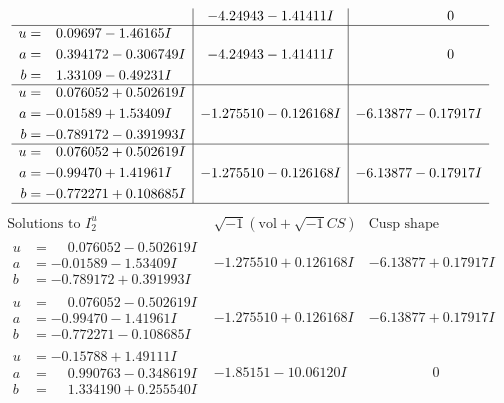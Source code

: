 \documentclass[1p]{elsarticle_modified}
\theoremstyle{definition}
\newcommand{\I}{\sqrt{-1}}
\begin{document}
$$\begin{array}{c|c|c}
 & -4.24943 - 1.41411 I & \phantom{-0.000000 } 0 \\ \hline\begin{aligned}
u &= \phantom{-}0.09697 - 1.46165 I \\
a &= \phantom{-}0.394172 - 0.306749 I \\
b &= \phantom{-}1.33109 - 0.49231 I\end{aligned}
 & -4.24943 - 1.41411 I & \phantom{-0.000000 } 0 \\ \hline\begin{aligned}
u &= \phantom{-}0.076052 + 0.502619 I \\
a &= -0.01589 + 1.53409 I \\
b &= -0.789172 - 0.391993 I\end{aligned}
 & -1.275510 - 0.126168 I & -6.13877 - 0.17917 I \\ \hline\begin{aligned}
u &= \phantom{-}0.076052 + 0.502619 I \\
a &= -0.99470 + 1.41961 I \\
b &= -0.772271 + 0.108685 I\end{aligned}
 & -1.275510 - 0.126168 I & -6.13877 - 0.17917 I\\
 \hline 
 \end{array}$$\newpage$$\begin{array}{c|c|c}  
\text{Solutions to }I^u_{2}& \I (\text{vol} + \sqrt{-1}CS) & \text{Cusp shape}\\
 \hline 
\begin{aligned}
u &= \phantom{-}0.076052 - 0.502619 I \\
a &= -0.01589 - 1.53409 I \\
b &= -0.789172 + 0.391993 I\end{aligned}
 & -1.275510 + 0.126168 I & -6.13877 + 0.17917 I \\ \hline\begin{aligned}
u &= \phantom{-}0.076052 - 0.502619 I \\
a &= -0.99470 - 1.41961 I \\
b &= -0.772271 - 0.108685 I\end{aligned}
 & -1.275510 + 0.126168 I & -6.13877 + 0.17917 I \\ \hline\begin{aligned}
u &= -0.15788 + 1.49111 I \\
a &= \phantom{-}0.990763 - 0.348619 I \\
b &= \phantom{-}1.334190 + 0.255540 I\end{aligned}
 & -1.85151 - 10.06120 I & \phantom{-0.000000 } 0 \\ \hline\begin{aligned}

\end{aligned}
\end{array}$$
\end{document}
